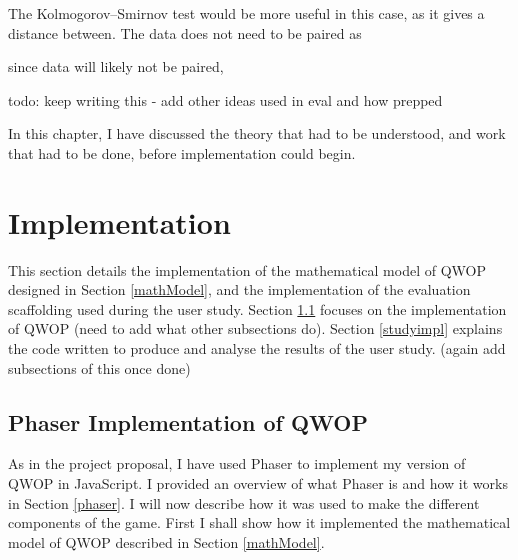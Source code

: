 \documentclass[12pt,a4paper,twoside,openright]{report}
\begin{document}
The Kolmogorov–Smirnov test would be more useful in this case, as it gives a distance between. The data does not need to be paired as 

since data will likely not be paired, 

todo: keep writing this - add other ideas used in eval and how prepped



In this chapter, I have discussed the theory that had to be understood, and work that
had to be done, before implementation could begin.




\chapter{Implementation}
This section details the implementation of the mathematical model of QWOP 
designed in Section \ref{mathModel}, and the implementation of the evaluation scaffolding used during the user study.
Section \ref{sec:qwopImp} focuses on the implementation of QWOP
(need to add what other subsections do).
Section \ref{studyimpl} explains the code written to produce and analyse the results of the user study.
(again add subsections of this once done) 


\section{Phaser Implementation of QWOP}
\label{sec:qwopImp}
As in the project proposal, I have used Phaser to implement my version of QWOP in JavaScript.
I provided an overview of what Phaser is and how it works in Section \ref{phaser}.
I will now describe how it was used to make the different components of the game. First I shall show how it implemented the mathematical model of QWOP described in Section \ref{mathModel}.
\end{document}
